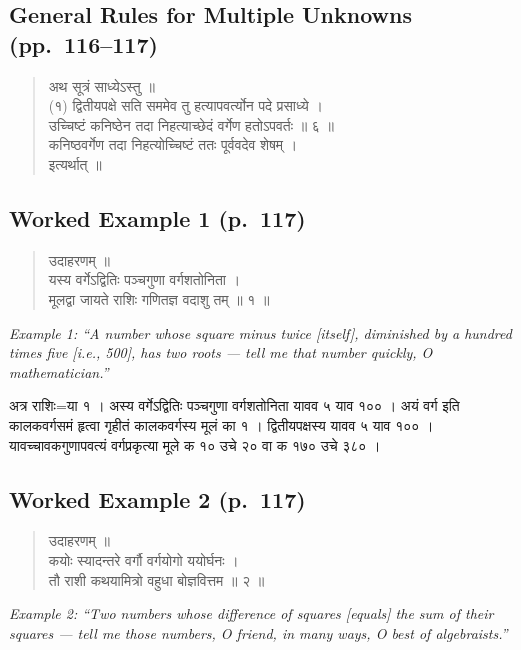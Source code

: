 \documentclass[11pt,a4paper]{article}
\newcommand{\cnote}[1]{\textcolor{notecolor}{\textit{#1}}}
\newcommand{\dev}[1]{{\devanagarifont #1}}
\newenvironment{sanskritverse}{%
  \begin{verse}
}{%
  \end{verse}
}
\begin{document}
\subsection{General Rules for Multiple Unknowns (pp.\ 116--117)}

\begin{sanskritverse}
\dev{%
अथ सूत्रं साध्येऽस्तु ॥\\[0.5em]
(१) द्वितीयपक्षे सति सममेव तु हत्यापवर्त्योन पदे प्रसाध्ये ।\\
उच्चिष्टं कनिष्ठेन तदा निहत्याच्छेदं वर्गेण हतोऽपवर्तः ॥ ६ ॥\\[0.5em]
कनिष्ठवर्गेण तदा निहत्योच्चिष्टं ततः पूर्ववदेव शेषम् ।\\
इत्यर्थात् ॥}
\end{sanskritverse}

\subsection*{Worked Example 1 (p.\ 117)}

\begin{sanskritverse}
\dev{%
उदाहरणम् ॥\\[0.3em]
यस्य वर्गेऽद्वितिः पञ्चगुणा वर्गशतोनिता ।\\
मूलद्वा जायते राशिः गणितज्ञ वदाशु तम् ॥ १ ॥}
\end{sanskritverse}

\cnote{Example 1: ``A number whose square minus twice [itself], diminished by a hundred times five [i.e., 500], has two roots --- tell me that number quickly, O mathematician.''}

\dev{%
अत्र राशिः=या १ । अस्य वर्गेऽद्वितिः पञ्चगुणा वर्गशतोनिता यावव ५ याव १०० । अयं वर्ग इति कालकवर्गसमं हृत्वा गृहीतं कालकवर्गस्य मूलं का १ । द्वितीयपक्षस्य यावव ५ याव १०० ।\\
यावच्चावकगुणापवत्यं वर्गप्रकृत्या मूले क १० उचे २० वा क १७० उचे ३८० ।}

\subsection*{Worked Example 2 (p.\ 117)}

\begin{sanskritverse}
\dev{%
उदाहरणम् ॥\\[0.3em]
कयोः स्यादन्तरे वर्गौ वर्गयोगो ययोर्घनः ।\\
तौ राशी कथयामित्रो वहुधा बोज्ञवित्तम ॥ २ ॥}
\end{sanskritverse}

\cnote{Example 2: ``Two numbers whose difference of squares [equals] the sum of their squares --- tell me those numbers, O friend, in many ways, O best of algebraists.''}
\end{document}
